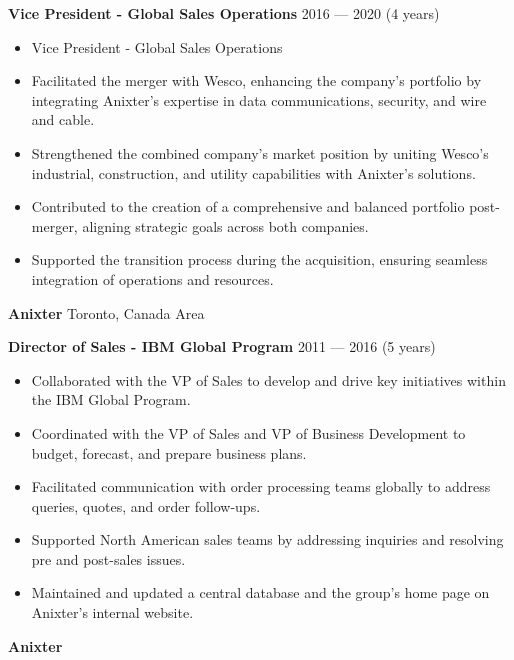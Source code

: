 \documentclass[11pt]{article}
\begin{document}
\textbf{Vice President - Global Sales Operations} \hfill 2016 — 2020 (4 years)
\begin{itemize}[noitemsep, topsep=0pt, partopsep=0pt, parsep=0pt]
    \item Vice President - Global Sales Operations
    \item Facilitated the merger with Wesco, enhancing the company's portfolio by integrating Anixter's expertise in data communications, security, and wire and cable.
    \item Strengthened the combined company's market position by uniting Wesco's industrial, construction, and utility capabilities with Anixter's solutions.
    \item Contributed to the creation of a comprehensive and balanced portfolio post-merger, aligning strategic goals across both companies.
    \item Supported the transition process during the acquisition, ensuring seamless integration of operations and resources.
\end{itemize}
\vspace{8pt}
\textbf{Anixter} \hfill Toronto, Canada Area

\textbf{Director of Sales - IBM Global Program} \hfill 2011 — 2016 (5 years)
\begin{itemize}[noitemsep, topsep=0pt, partopsep=0pt, parsep=0pt]
    \item Collaborated with the VP of Sales to develop and drive key initiatives within the IBM Global Program.
    \item Coordinated with the VP of Sales and VP of Business Development to budget, forecast, and prepare business plans.
    \item Facilitated communication with order processing teams globally to address queries, quotes, and order follow-ups.
    \item Supported North American sales teams by addressing inquiries and resolving pre and post-sales issues.
    \item Maintained and updated a central database and the group’s home page on Anixter’s internal website.
\end{itemize}
\vspace{8pt}
\textbf{Anixter} \hfill 
\end{document}
